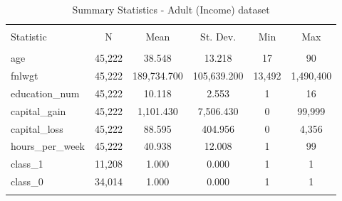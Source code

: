 
\begin{table}[H] \centering 
  \caption{Summary Statistics - Adult (Income) dataset} 
  \label{tbl:summary_stats_50k_2} 
\begin{tabular}{@{\extracolsep{5pt}}lccccc} 
\\[-1.8ex]\hline 
\hline \\[-1.8ex] 
Statistic & \multicolumn{1}{c}{N} & \multicolumn{1}{c}{Mean} & \multicolumn{1}{c}{St. Dev.} & \multicolumn{1}{c}{Min} & \multicolumn{1}{c}{Max} \\ 
\hline \\[-1.8ex] 
age & 45,222 & 38.548 & 13.218 & 17 & 90 \\ 
fnlwgt & 45,222 & 189,734.700 & 105,639.200 & 13,492 & 1,490,400 \\ 
education\_num & 45,222 & 10.118 & 2.553 & 1 & 16 \\ 
capital\_gain & 45,222 & 1,101.430 & 7,506.430 & 0 & 99,999 \\ 
capital\_loss & 45,222 & 88.595 & 404.956 & 0 & 4,356 \\ 
hours\_per\_week & 45,222 & 40.938 & 12.008 & 1 & 99 \\ 
class\_1 & 11,208 & 1.000 & 0.000 & 1 & 1 \\ 
class\_0 & 34,014 & 1.000 & 0.000 & 1 & 1 \\ 
\hline \\[-1.8ex] 
\end{tabular} 
\end{table} 
